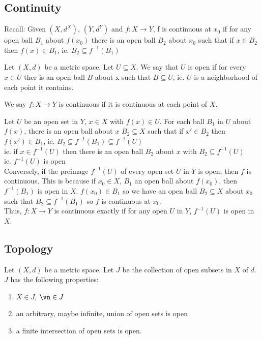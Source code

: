 
\subsection{Continuity}

Recall: Given $(X, d^X)$, $(Y, d^Y)$ and $f: X \to Y$, f is continuous at $x_0$ if for any open ball $B_1$ about $f(x_0)$ there is an open ball $B_2$ about $x_0$ such that if $x \in B_2$ then $f(x) \in B_1$, ie. $B_2 \subseteq f^{-1}(B_1)$

\begin{definition}
    Let $(X,d)$ be a metric space. Let $U \subseteq X$. We say that $U$ is open if for every $x \in U$ ther is an open ball $B$ about x such that $B \subseteq U$, ie. $U$ is a neighborhood of each point it contains. 
\end{definition}

\noindent
We say $f: X \to Y$ is continuous if it is continuous at each point of $X$.

\noindent
Let $U$ be an open set in $Y$, $x \in X$ with $f(x) \in U$. For each ball $B_1$ in $U$ about $f(x)$, there is an open ball about $x$ $B_2 \subseteq X$ such that if $x' \in B_2$ then $f(x') \in B_1$, ie. $B_2 \subseteq f^{-1}(B_1) \subseteq f^{-1}(U)$ \\
ie. if $x \in f^{-1}(U)$ then there is an open ball $B_2$ about $x$ with $B_2 \subseteq f^{-1}(U)$ \\
ie. $f^{-1}(U)$ is open \\
Conversely, if the preimage $f^{-1}(U)$ of every open set $U$ in $Y$ is open, then $f$ is continuous. This is because if $x_0 \in X$, $B_1$ an open ball about $f(x_0)$, then $f^{-1}(B_1)$ is open in $X$. $f(x_0) \in B_1$ so we have an open ball $B_2 \subseteq X$ about $x_0$ such that $B_2 \subseteq f^{-1}(B_1)$ so $f$ is continuous at $x_0$. \\
Thus, $f : X \to Y$ is continuous exactly if for any open $U$ in $Y$, $f^{-1}(U)$ is open in $X$. 

\subsection{Topology}

Let $(X,d)$ be a metric space. Let $J$ be the collection of open subsets in $X$ of $d$. $J$ has the following properties: 
\begin{enumerate}
    \item $X \in J$, $\vn \in J$
    \item an arbitrary, maybe infinite, union of open sets is open 
    \item a finite intersection of open sets is open. 
\end{enumerate}

